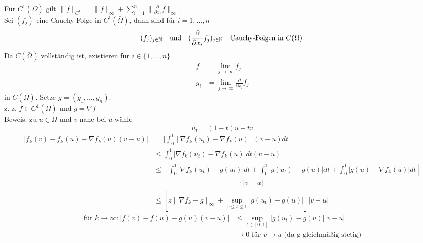\begin{beweis}
	Für $C^{1}(\bar \Omega)$ gilt $\| f \|_{C^{1}} = \| f \|_{\infty} + \sum_{i = 1}^{n}  \| \frac{\partial}{\partial x_{i}} f \|_{\infty}$. \\
	Sei $(f_{j})$ eine Cauchy-Folge in $C^{1}(\bar \Omega)$, dann sind für $i = 1, \dotsc, n $
		\[ (f_{j})_{j \in \MdN} \quad \text{und} \quad (\frac{\partial}{\partial x_{i}} f_{j})_{j \in \MdN} \quad \text{Cauchy-Folgen in } C(\bar \Omega) \]
	Da $C(\bar \Omega)$ vollständig ist, existieren für $i \in \{ 1, \dotsc, n \} $
		\begin{align*}
		 		f & = \lim_{j \rightarrow \infty} f_{j} \\
		 		g_{i} & = \lim_{j \rightarrow \infty} \frac{\partial}{\partial x_{i}} f_{j}
		\end{align*}
	in $C(\bar \Omega)$. Setze $g = (g_{1}, \dotsc, g_{n})$. \\
	
	z. z. $f \in C^{1}(\bar \Omega)$ und $g = \nabla f$ \\
	Beweis: zu $u \in \Omega$ und $v$ nahe bei $u$ wähle
		\[ u_{t} = (1 - t) u + t v \]
		\begin{align*}
		 	| f_{k}(v) - f_{k} (u) - \nabla f_{k}(u) (v - u) | & = | \int_{0}^{1} [ \nabla f_{k} (u_{t}) - \nabla f_{k} (u) ] (v - u) dt \\
		 		& \leq  \int_{0}^{1} | \nabla f_{k} (u_{t}) - \nabla f_{k} (u) | dt (v - u) \\
		 		& \leq \left[ \int_{0}^{1} | \nabla f_{k}(u_{t}) - g(u_{t}) | dt + \int_{0}^{1} | g(u_{t}) - g(u) | dt + \int_{0}^{1} | g(u) - \nabla f_{k}(u) | dt \right] \\
		 		&  \hspace{5cm} \cdot |v - u| \\
		 		& \leq \left[ z \| \nabla f_{k} - g \|_{\infty} + \sup_{0 \leq t \leq 1} | g(u_{t}) - g(u) | \right] |v - u|
 		\end{align*}
 		\begin{align*}
 		 	\text{für } k \rightarrow \infty: | f(v) - f(u) - g(u)(v - u) | & \leq \sup_{t \in [0, 1]} | g(u_{t}) - g(u) | |v - u| \\
 		 		& \rightarrow 0 \text{ für } v \rightarrow u \text{ (da g gleichmä{\ss}ig stetig)}
		\end{align*} 
\end{beweis}
	

